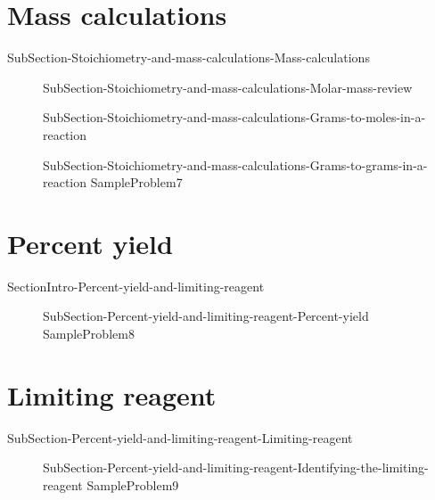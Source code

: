 \documentclass[main.tex]{subfiles}
\begin{document}
 


\section{Mass calculations}{SubSection-Stoichiometry-and-mass-calculations-Mass-calculations}
\sloppy \begin{description}
\item[]  {SubSection-Stoichiometry-and-mass-calculations-Molar-mass-review}
\item[] {SubSection-Stoichiometry-and-mass-calculations-Grams-to-moles-in-a-reaction}
\item[] {SubSection-Stoichiometry-and-mass-calculations-Grams-to-grams-in-a-reaction}
{SampleProblem7}
\end{description}




\section{Percent yield}{SectionIntro-Percent-yield-and-limiting-reagent}
\sloppy \begin{description}
\item[] {SubSection-Percent-yield-and-limiting-reagent-Percent-yield}
{SampleProblem8}
\end{description}


\section{Limiting reagent}{SubSection-Percent-yield-and-limiting-reagent-Limiting-reagent}
\sloppy \begin{description}
\item[] {SubSection-Percent-yield-and-limiting-reagent-Identifying-the-limiting-reagent}
{SampleProblem9}
\end{description}
\end{document}
